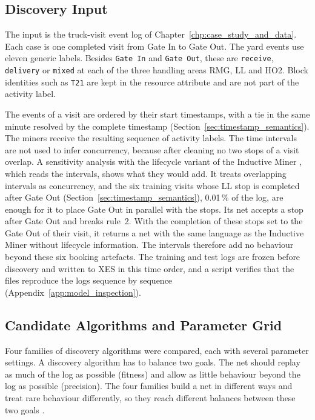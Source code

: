 \subsection{Discovery Input}
\label{sec:exp_discovery_input}

The input is the truck-visit event log of
Chapter~\ref{chp:case_study_and_data}. Each case is one completed visit
from Gate In to Gate Out. The yard events use eleven generic labels.
Besides \texttt{Gate In} and \texttt{Gate Out}, these are \texttt{receive},
\texttt{delivery} or \texttt{mixed} at each of the three handling areas RMG, LL
and HO2. Block identities such as \texttt{T21} are kept in the resource
attribute and are not part of the activity label.

The events of a visit are ordered by their start timestamps, with a tie in the
same minute resolved by the complete timestamp
(Section~\ref{sec:timestamp_semantics}). The miners receive the resulting sequence
of activity labels. The time intervals are not used to infer concurrency, because
after cleaning no two stops of a visit overlap. A sensitivity analysis with the
lifecycle variant of the Inductive Miner \cite{RWLeemans2016Lifecycle}, which reads
the intervals, shows what they would add. It treats overlapping intervals as
concurrency, and the six training visits whose LL stop is completed after Gate Out
(Section~\ref{sec:timestamp_semantics}), 0.01\,\% of the log, are enough for it to
place Gate Out in parallel with the stops. Its net accepts a stop after Gate Out
and breaks rule~2. With the completion of these stops set to the Gate Out of their
visit, it returns a net with the same language as the Inductive Miner without
lifecycle information. The intervals therefore add no behaviour beyond these six
booking artefacts. The training and test logs are frozen before discovery and
written to XES in this time order, and a script verifies that the files reproduce
the logs sequence by sequence (Appendix~\ref{app:model_inspection}).

\subsection{Candidate Algorithms and Parameter Grid}
\label{sec:exp_candidates}

Four families of discovery algorithms were compared, each with several parameter
settings. A discovery algorithm has to balance two goals. The net should replay as
much of the log as possible (fitness) and allow as little behaviour beyond the log
as possible (precision). The four families build a net in different ways and treat
rare behaviour differently, so they reach different balances between these two
goals \cite{DiscoveryBenchmark}.


